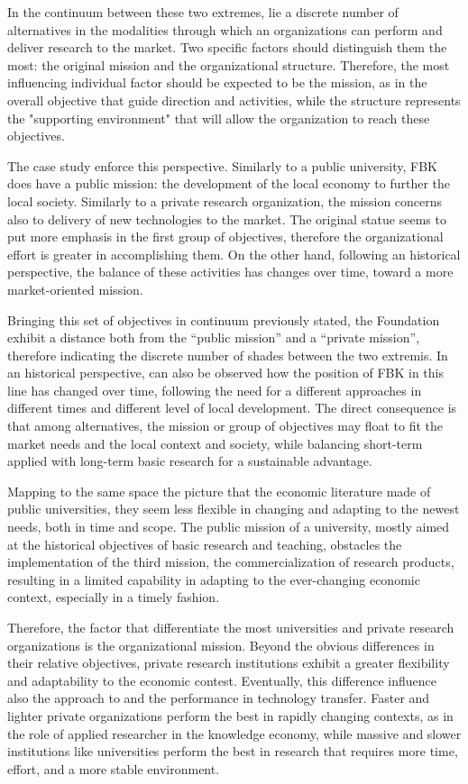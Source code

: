 In the continuum between these two extremes, lie a discrete number of alternatives in the modalities through which an organizations can perform and deliver research to the market. Two specific factors should distinguish them the most: the original mission and the organizational structure. Therefore, the most influencing individual factor should be expected to be the mission, as in the overall objective that guide direction and activities, while the structure represents the "supporting environment" that will allow the organization to reach these objectives. 

The case study enforce this perspective. Similarly to a public university, FBK does have a public mission: the development of the local economy to further the local society. Similarly to a private research organization, the mission concerns also to delivery of new technologies to the market. The original statue seems to put more emphasis in the first group of objectives, therefore the organizational effort is greater in accomplishing them. On the other hand, following an historical perspective, the balance of these activities has changes over time, toward a more market-oriented mission.

Bringing this set of objectives in continuum previously stated, the Foundation exhibit a distance both from the \enquote{public mission} and a \enquote{private mission}, therefore indicating the discrete number of shades between the two extremis. In an historical perspective, can also be observed how the position of FBK in this line has changed over time, following the need for a different approaches in different times and different level of local development. The direct consequence is that among alternatives, the mission or group of objectives may float to fit the market needs and the local context and society, while balancing short-term applied with long-term basic research for a sustainable advantage.

Mapping to the same space the picture that the economic literature made of public universities, they seem less flexible in changing and adapting to the newest needs, both in time and scope. The public mission of a university, mostly aimed at the historical objectives of basic research and teaching, obstacles the implementation of the third mission, the commercialization of research products, resulting in a limited capability in adapting to the ever-changing economic context, especially in a timely fashion.

Therefore, the factor that differentiate the most universities and private research organizations is the organizational mission. Beyond the obvious differences in their relative objectives, private research institutions exhibit a greater flexibility and adaptability to the economic contest. Eventually, this difference influence also the approach to and the performance in technology transfer. Faster and lighter private organizations perform the best in rapidly changing contexts, as in the role of applied researcher in the knowledge economy, while massive and slower institutions like universities perform the best in research that requires more time, effort, and a more stable environment.

